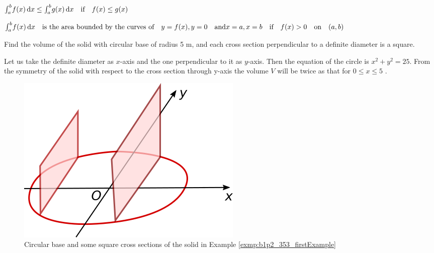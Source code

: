 \documentclass[11pt]{amsbook}
\begin{document}

	\begin{hEnumerateArabic}
		\item
		$ 
		\int_{a}^{b} \! f(x) \, \mathrm{d} x
		\leq
		\int_{a}^{b} \! g(x) \, \mathrm{d} x
		\quad \text{if} \quad
		f(x) \leq g(x)
		$

		\item
		$
		\int_{a}^{b} \! f(x) \, \hDif x
		\quad \text{is the area bounded by the curves of} \quad
		y = f(x), y = 0
		\quad \text{and} \hNewLine
		x = a, x = b
		\quad \text{if} \quad
		f(x) > 0
		\quad \text{on} \quad
		(a,b)
		$
	\end{hEnumerateArabic}


\begin{exmp}
\label{exmp:b1p2_353_firstExample} 
	Find the volume of the solid with circular base of radius 5 m,
	and each cross section perpendicular to a definite diameter is a square.
	
	\begin{hSolution}
		Let us take the definite diameter as
		$ x $-axis
		and the one perpendicular to it as 
		$ y $-axis.
		Then the equation of the circle is
		$ x^{2} + y^{2} = 25 $.
		From the symmetry of the solid with respect to the cross section through y-axis
		the volume
		$ V $
		will be twice as that for
		$ 0 \leq x \leq 5 $
		.

		\begin{figure}[h]
		  \begin{center}
		    \includegraphics[scale=0.4]{images/b1p2-353-fig01.png}
		  \end{center}
		  \caption{Circular base and some square cross sections of the solid in Example \ref{exmp:b1p2_353_firstExample}}
		\end{figure}


\end{hSolution}
\end{exmp}
\end{document}
